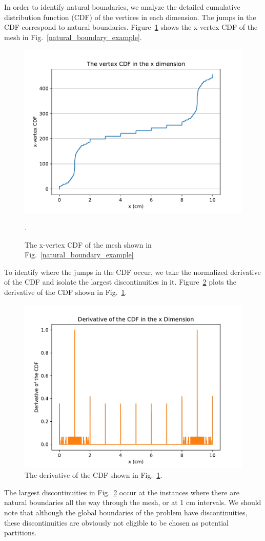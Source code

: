 \documentclass[times,final]{elsarticle}
\begin{document}
In order to identify natural boundaries, we analyze the detailed cumulative distribution function (CDF) of the vertices in each dimension. The jumps in the CDF correspond to natural boundaries. Figure~\ref{vert_cdf} shows the x-vertex CDF of the mesh in Fig.~\ref{natural_boundary_example}.
\begin{figure}[h]
\centering
\includegraphics[scale=0.75]{../figures/xvertexcdf.pdf}
\caption{The x-vertex CDF of the mesh shown in Fig.~\ref{natural_boundary_example}}.
\label{vert_cdf}
\end{figure}

To identify where the jumps in the CDF occur, we take the normalized derivative of the CDF and isolate the largest discontinuities in it. Figure~\ref{gradcdf} plots the derivative of the CDF shown in Fig.~\ref{vert_cdf}.
\begin{figure}[h]
\centering
\includegraphics[scale=0.75]{../figures/gradcdf.pdf}
\caption{The derivative of the CDF shown in Fig.~\ref{vert_cdf}.}
\label{gradcdf}
\end{figure}
The largest discontinuities in Fig.~\ref{gradcdf} occur at the instances where there are natural boundaries all the way through the mesh, or at 1 cm intervals.
We should note that although the global boundaries of the problem have discontinuities, these discontinuities are obviously not eligible to be chosen as potential partitions.
\end{document}
